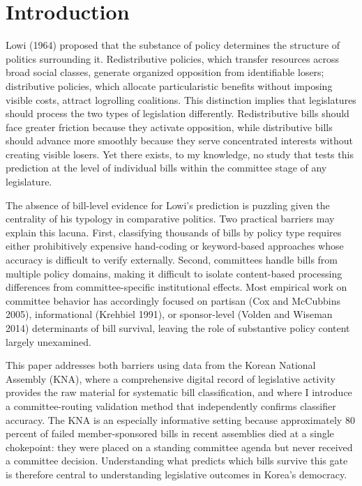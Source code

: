 \documentclass[11pt]{article}
\begin{document}
\section{Introduction}
\label{sec:intro}

Lowi (1964) proposed that the substance of policy determines the structure of politics surrounding it. Redistributive policies, which transfer resources across broad social classes, generate organized opposition from identifiable losers; distributive policies, which allocate particularistic benefits without imposing visible costs, attract logrolling coalitions. This distinction implies that legislatures should process the two types of legislation differently. Redistributive bills should face greater friction because they activate opposition, while distributive bills should advance more smoothly because they serve concentrated interests without creating visible losers. Yet there exists, to my knowledge, no study that tests this prediction at the level of individual bills within the committee stage of any legislature.

The absence of bill-level evidence for Lowi's prediction is puzzling given the centrality of his typology in comparative politics. Two practical barriers may explain this lacuna. First, classifying thousands of bills by policy type requires either prohibitively expensive hand-coding or keyword-based approaches whose accuracy is difficult to verify externally. Second, committees handle bills from multiple policy domains, making it difficult to isolate content-based processing differences from committee-specific institutional effects. Most empirical work on committee behavior has accordingly focused on partisan (Cox and McCubbins 2005), informational (Krehbiel 1991), or sponsor-level (Volden and Wiseman 2014) determinants of bill survival, leaving the role of substantive policy content largely unexamined.

This paper addresses both barriers using data from the Korean National Assembly (KNA), where a comprehensive digital record of legislative activity provides the raw material for systematic bill classification, and where I introduce a committee-routing validation method that independently confirms classifier accuracy. The KNA is an especially informative setting because approximately 80 percent of failed member-sponsored bills in recent assemblies died at a single chokepoint: they were placed on a standing committee agenda but never received a committee decision. Understanding what predicts which bills survive this gate is therefore central to understanding legislative outcomes in Korea's democracy.
\end{document}
